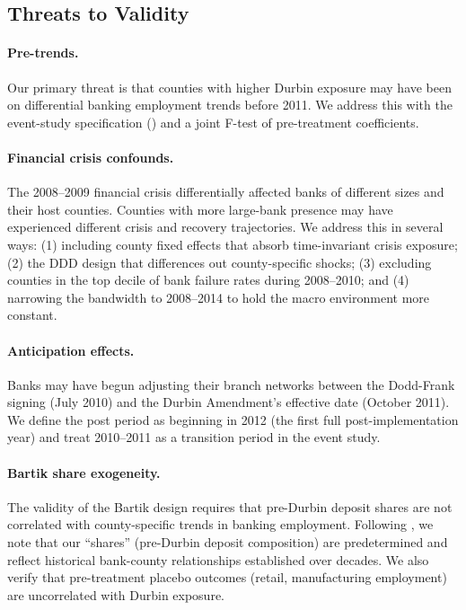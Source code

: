 \documentclass[12pt]{article}
\begin{document}
\subsection{Threats to Validity}

\paragraph{Pre-trends.} Our primary threat is that counties with higher Durbin exposure may have been on differential banking employment trends before 2011. We address this with the event-study specification () and a joint F-test of pre-treatment coefficients.

\paragraph{Financial crisis confounds.} The 2008--2009 financial crisis differentially affected banks of different sizes and their host counties. Counties with more large-bank presence may have experienced different crisis and recovery trajectories. We address this in several ways: (1) including county fixed effects that absorb time-invariant crisis exposure; (2) the DDD design that differences out county-specific shocks; (3) excluding counties in the top decile of bank failure rates during 2008--2010; and (4) narrowing the bandwidth to 2008--2014 to hold the macro environment more constant.

\paragraph{Anticipation effects.} Banks may have begun adjusting their branch networks between the Dodd-Frank signing (July 2010) and the Durbin Amendment's effective date (October 2011). We define the post period as beginning in 2012 (the first full post-implementation year) and treat 2010--2011 as a transition period in the event study.

\paragraph{Bartik share exogeneity.} The validity of the Bartik design requires that pre-Durbin deposit shares are not correlated with county-specific trends in banking employment. Following \citet{goldsmith2020}, we note that our ``shares'' (pre-Durbin deposit composition) are predetermined and reflect historical bank-county relationships established over decades. We also verify that pre-treatment placebo outcomes (retail, manufacturing employment) are uncorrelated with Durbin exposure.
\end{document}
